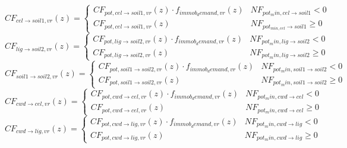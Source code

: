 \begin{equation}
C F_{cel \rightarrow { soil1,vr }}(z)=\left\{\begin{array}{ll}C F_{pot, cel \rightarrow { soil1,vr }}(z) \cdot f_{i m m o b_{d} e m a n d, vr}(z) & N F_{pot_{m} i n, cel \rightarrow { soil1 }}<0 \\ C F_{pot, cel \rightarrow { soil1,vr }}(z) & N F_{pot_{m in,cel } \rightarrow { soil1 }} \geq 0\end{array}\right.
\end{equation}
\begin{equation}
C F_{{lig } \rightarrow { soil2,vr }}(z)=\left\{\begin{array}{ll}C F_{pot, lig \rightarrow { soil2,vr }}(z) \cdot f_{{immob }_{d} { emand }, vr}(z) & N F_{pot_{m} i n, lig \rightarrow { soil2 }}<0 \\ C F_{pot, lig \rightarrow { soil2,vr }}(z) & N F_{pot_{m} i n, lig \rightarrow { soil } 2} \geq 0\end{array}\right.
\end{equation}
\begin{equation}
    C F_{{soil1 } \rightarrow { soil2,vr }}(z)=\left\{\begin{array}{ll}C F_{pot, soil1 \rightarrow { soil2,vr }}(z) \cdot f_{{immob }_{d} { emand }, vr}(z) & N F_{pot_{m} i n, soil1 \rightarrow { soil2 }}<0 \\ C F_{pot, soil1 \rightarrow { soil2,vr }}(z) & N F_{pot_{m} i n, soil1 \rightarrow { soil } 2} \geq 0\end{array}\right.
\end{equation}
\begin{equation}
C F_{c w d \rightarrow cel, vr}(z)=\left\{\begin{array}{ll}C F_{pot, c w d \rightarrow cel, vr}(z) \cdot f_{i m m o b_{d} e m a n d, vr}(z) & N F_{pot_{m} i n, c w d \rightarrow cel}<0 \\ C F_{pot, c w d \rightarrow cel, vr}(z) & N F_{pot_{m} i n, c w d \rightarrow cel} \geq 0\end{array}\right.
\end{equation}
\begin{equation}
C F_{c w d \rightarrow lig, vr}(z)=\left\{\begin{array}{ll}C F_{pot, c w d \rightarrow lig, vr}(z) \cdot f_{i m m o b_{d} e m a n d, vr}(z) & N F_{pot_{m} i n, c w d \rightarrow lig}<0 \\ C F_{pot, c w d \rightarrow lig, vr}(z) & N F_{pot_{m} i n, c w d \rightarrow lig} \geq 0\end{array}\right.
\end{equation}
